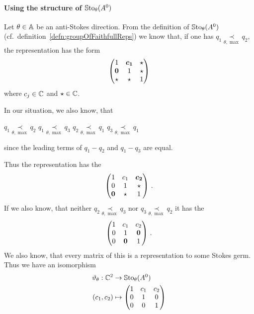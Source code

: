 \paragraph{Using the structure of $\operatorname{\mathbb{S}to}_\theta(A^0)$}
\begin{exmp}
  Let $\theta\in\mathbb{A}$ be an anti-Stokes direction.
  From the definition of $\operatorname{\mathbb{S}to}_\theta(A^0)$ (cf.\
  definition~\ref{defn:groupOfFaithfullReps}) we know that, if one has $q_1
  \underset{\theta,\max}{\prec} q_2$, the representation has the form
  \[
    \begin{pmatrix}
      1 & \text{\boldmath$c_1$} & \star
    \\\text{\boldmath$0$} & 1 & \star
    \\\star & \star & 1
    \end{pmatrix}
  \]
  where $c_j\in\mathbb{C}$ and $\star\in\mathbb{C}$.
  \begin{s-rem}
    In our situation, we also know, that
    \begin{einr}
      $q_1 \underset{\theta,\max}{\prec} q_2$
      \Leftrightarrow{}
      $q_1 \underset{\theta,\max}{\prec} q_3$
      \qquad {} \qquad
      $q_2 \underset{\theta,\max}{\prec} q_1$
      \Leftrightarrow{}
      $q_3 \underset{\theta,\max}{\prec} q_1$
    \end{einr}
    since the leading terms of $q_1-q_2$ and $q_1-q_3$ are equal.
  \end{s-rem}
  Thus the representation has the 
  \[
    \begin{pmatrix}
      1 & c_1 & \text{\boldmath$c_2$}
    \\0 & 1 & \star
    \\\text{\boldmath$0$} & \star & 1
    \end{pmatrix}\,.
  \]
  If we also know, that neither $q_2 \underset{\theta,\max}{\prec} q_3$ nor
  $q_3 \underset{\theta,\max}{\prec} q_2$ it has the \rewrite{form}
  \[
    \begin{pmatrix}
      1 & c_1 & c_2
    \\0 & 1 & \text{\boldmath$0$}
    \\0 & \text{\boldmath$0$} & 1
    \end{pmatrix}\,.
  \]
  We also know, that every matrix of this  is a representation to
  some Stokes germ.
  Thus we have an isomorphism
  \begin{align*}
    \vartheta_\theta:\mathbb{C}^2 &\to \operatorname{\mathbb{S}to}_\theta(A^0)
  \\(c_1,c_2)&\mapsto
    \begin{pmatrix}
      1 & c_1 & c_2
    \\0 & 1 & 0
    \\0 & 0 & 1
    \end{pmatrix}
  \end{align*}
\end{exmp}
